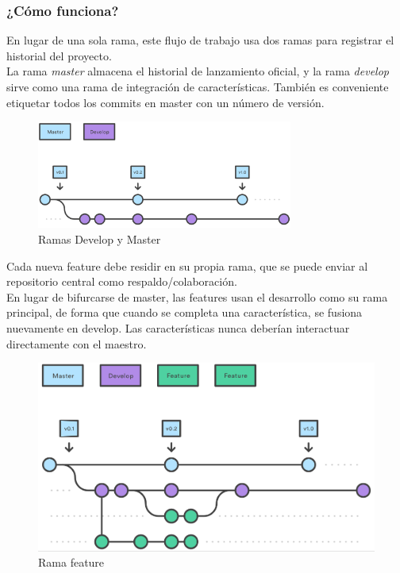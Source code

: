 \subsubsection{¿Cómo funciona?}


\quad En lugar de una sola rama, este flujo de trabajo usa dos ramas para registrar el historial del proyecto.\\ 

\quad La rama \textit{master} almacena el historial de lanzamiento oficial, y la rama \textit{develop} sirve como una rama de integración de características. También es conveniente etiquetar todos los commits en master con un número de versión.\\

\begin{figure}[htb]
	\centering
	\includegraphics[width=0.75\textwidth]{./imagenes/master-dev}
	\caption{Ramas Develop y Master}
\end{figure}


\quad Cada nueva feature debe residir en su propia rama, que se puede enviar al repositorio central como respaldo/colaboración.\\

\quad En lugar de bifurcarse de master, las features usan el desarrollo como su rama principal, de forma que cuando se completa una característica, se fusiona nuevamente en develop. Las características nunca deberían interactuar directamente con el maestro.\\

\begin{figure}[htb]
	\centering
	\includegraphics[width=1\textwidth]{./imagenes/feature}
	\caption{Rama feature}
\end{figure}

